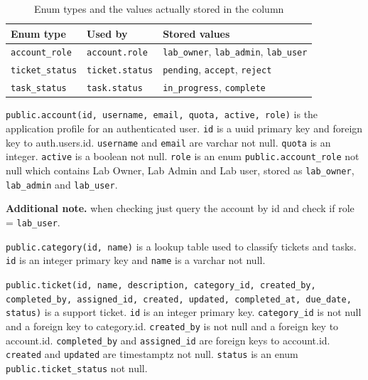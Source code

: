 \documentclass[12pt,letterpaper]{article}
\newenvironment{note}[1][Additional note]
  {\begin{notebox}\noindent\textbf{#1.}\space\ignorespaces}
  {\end{notebox}}
\begin{document}
\begin{table}[H]
  \footnotesize
  \begin{tabularx}{\textwidth}{@{}ll>{\RaggedRight\arraybackslash}X@{}}
    \toprule
    \textbf{Enum type} & \textbf{Used by} & \textbf{Stored values} \\
    \midrule
    \texttt{account\_role} & \texttt{account.role} &
      \texttt{lab\_owner}, \texttt{lab\_admin}, \texttt{lab\_user} \\
    \addlinespace[2pt]
    \texttt{ticket\_status} & \texttt{ticket.status} &
      \texttt{pending}, \texttt{accept}, \texttt{reject} \\
    \addlinespace[2pt]
    \texttt{task\_status} & \texttt{task.status} &
      \texttt{in\_progress}, \texttt{complete} \\
    \bottomrule
  \end{tabularx}
  \caption{Enum types and the values actually stored in the column}
  \label{tab:enums}
\end{table}

\texttt{public.account(id, username, email, quota, active, role)} is the
application profile for an authenticated user. \texttt{id} is a uuid primary
key and foreign key to auth.users.id. \texttt{username} and \texttt{email} are
varchar not null. \texttt{quota} is an integer. \texttt{active} is a boolean
not null. \texttt{role} is an enum \texttt{public.account\_role} not null which
contains Lab Owner, Lab Admin and Lab user, stored as \texttt{lab\_owner},
\texttt{lab\_admin} and \texttt{lab\_user}.

\begin{note}
when checking just query the account by id and check if
role = \texttt{lab\_user}.
\end{note}

\texttt{public.category(id, name)} is a lookup table used to classify tickets
and tasks. \texttt{id} is an integer primary key and \texttt{name} is a varchar
not null.

\texttt{public.ticket(id, name, description, category\_id, created\_by,
completed\_by, assigned\_id, created, updated, completed\_at, due\_date,
status)} is a support ticket. \texttt{id} is an integer primary key.
\texttt{category\_id} is not null and a foreign key to category.id.
\texttt{created\_by} is not null and a foreign key to account.id.
\texttt{completed\_by} and \texttt{assigned\_id} are foreign keys to
account.id. \texttt{created} and \texttt{updated} are timestamptz not null.
\texttt{status} is an enum \texttt{public.ticket\_status} not null.
\end{document}
